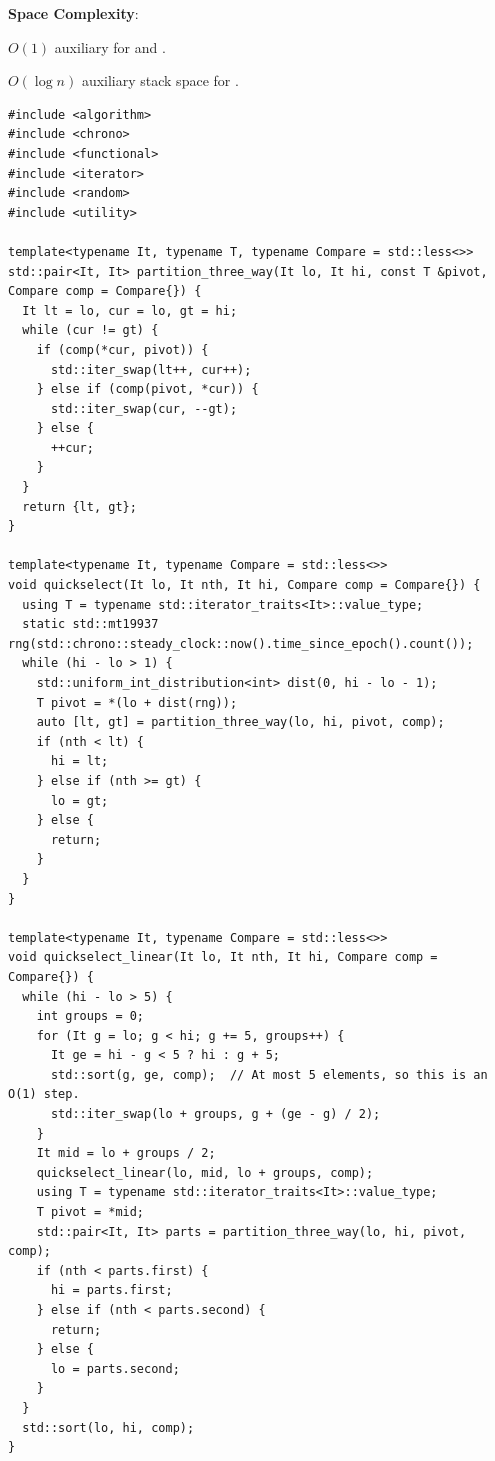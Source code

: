 \textbf{Space Complexity}:
\begin{compactitem}
  \item $O(1)$ auxiliary for  and .
  \item $O(\log n)$ auxiliary stack space for .
\end{compactitem}

\begin{lstlisting}[style=cpp]
#include <algorithm>
#include <chrono>
#include <functional>
#include <iterator>
#include <random>
#include <utility>

template<typename It, typename T, typename Compare = std::less<>>
std::pair<It, It> partition_three_way(It lo, It hi, const T &pivot, Compare comp = Compare{}) {
  It lt = lo, cur = lo, gt = hi;
  while (cur != gt) {
    if (comp(*cur, pivot)) {
      std::iter_swap(lt++, cur++);
    } else if (comp(pivot, *cur)) {
      std::iter_swap(cur, --gt);
    } else {
      ++cur;
    }
  }
  return {lt, gt};
}

template<typename It, typename Compare = std::less<>>
void quickselect(It lo, It nth, It hi, Compare comp = Compare{}) {
  using T = typename std::iterator_traits<It>::value_type;
  static std::mt19937 rng(std::chrono::steady_clock::now().time_since_epoch().count());
  while (hi - lo > 1) {
    std::uniform_int_distribution<int> dist(0, hi - lo - 1);
    T pivot = *(lo + dist(rng));
    auto [lt, gt] = partition_three_way(lo, hi, pivot, comp);
    if (nth < lt) {
      hi = lt;
    } else if (nth >= gt) {
      lo = gt;
    } else {
      return;
    }
  }
}

template<typename It, typename Compare = std::less<>>
void quickselect_linear(It lo, It nth, It hi, Compare comp = Compare{}) {
  while (hi - lo > 5) {
    int groups = 0;
    for (It g = lo; g < hi; g += 5, groups++) {
      It ge = hi - g < 5 ? hi : g + 5;
      std::sort(g, ge, comp);  // At most 5 elements, so this is an O(1) step.
      std::iter_swap(lo + groups, g + (ge - g) / 2);
    }
    It mid = lo + groups / 2;
    quickselect_linear(lo, mid, lo + groups, comp);
    using T = typename std::iterator_traits<It>::value_type;
    T pivot = *mid;
    std::pair<It, It> parts = partition_three_way(lo, hi, pivot, comp);
    if (nth < parts.first) {
      hi = parts.first;
    } else if (nth < parts.second) {
      return;
    } else {
      lo = parts.second;
    }
  }
  std::sort(lo, hi, comp);
}
\end{lstlisting}
